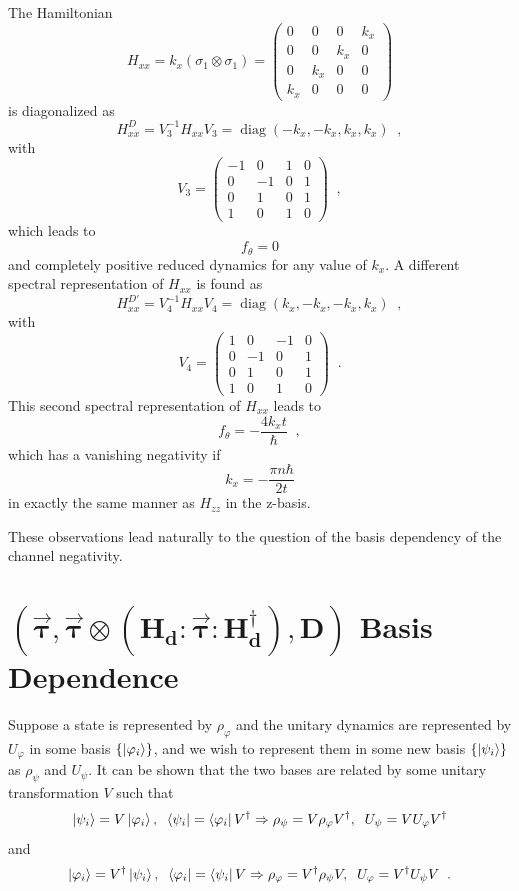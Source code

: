 \begin{example}
The Hamiltonian
$$
H_{xx} = k_x \left(\sigma_1\otimes\sigma_1\right) = \begin{pmatrix}
0&0&0&k_x\\
0&0&k_x&0\\
0&k_x&0&0\\
k_x&0&0&0
\end{pmatrix}
$$
is diagonalized as
$$
H_{xx}^D = V_3^{-1} H_{xx} V_3 = \operatorname{diag}(-k_x,-k_x,k_x,k_x)\;\;,
$$ 
with
$$
V_3 = \begin{pmatrix}
 -1 & 0 & 1 & 0 \\
 0 & -1 & 0 & 1 \\
 0 & 1 & 0 & 1 \\
 1 & 0 & 1 & 0
\end{pmatrix}\;\;,
$$
which leads to 
$$
f_\theta = 0
$$
and completely positive reduced dynamics for any value of $k_x$.  A different spectral representation of $H_{xx}$ is found as
$$
H_{xx}^{D\prime} = V_4^{-1} H_{xx} V_4 = \operatorname{diag}(k_x,-k_x,-k_x,k_x)\;\;,
$$
with
$$
V_4 = \begin{pmatrix}
 1 & 0 & -1 & 0 \\
 0 & -1 & 0 & 1 \\
 0 & 1 & 0 & 1 \\
 1 & 0 & 1 & 0
\end{pmatrix}\;\;.
$$
This second spectral representation of $H_{xx}$ leads to
$$
f_\theta = -\frac{4k_xt}{\hbar}\;\;,
$$
which has a vanishing negativity if
\begin{equation}
\label{eqn:neg_Hxx}
k_x = -\frac{\pi n \hbar}{2t}
\end{equation}
in exactly the same manner as $H_{zz}$ in the z-basis.  
\end{example}

These observations lead naturally to the question of the basis dependency of the channel negativity.  

\section{$\mathbf{(\vec{\tau},\vec{\tau}\otimes \left( H_d:\vec{\tau}:H_d^\dagger\right),D)}$ Basis Dependence}

Suppose a state is represented by $\rho_\varphi$ and the unitary dynamics are represented by $U_\varphi$ in some basis $\{\left|\varphi_i\right\rangle\}$, and we wish to represent them in some new basis $\{\left|\psi_i\right\rangle\}$ as $\rho_\psi$ and $U_\psi$.  It can be shown \cite{Zettili2009} that the two bases are related by some unitary transformation $V$ such that
$$
\left|\psi_i\right\rangle = V\left|\varphi_i\right\rangle,\;\;\left\langle\psi_i\right| = \left\langle\varphi_i\right|V^\dagger \Rightarrow \rho_\psi = V\rho_\varphi V^\dagger,\;\;U_\psi = V U_\varphi V^\dagger
$$
and
$$
\left|\varphi_i\right\rangle = V^\dagger\left|\psi_i\right\rangle,\;\;\left\langle\varphi_i\right| = \left\langle\psi_i\right|V \Rightarrow \rho_\varphi = V^\dagger\rho_\psi V,\;\;U_\varphi = V^\dagger U_\psi V\;\;.
$$

